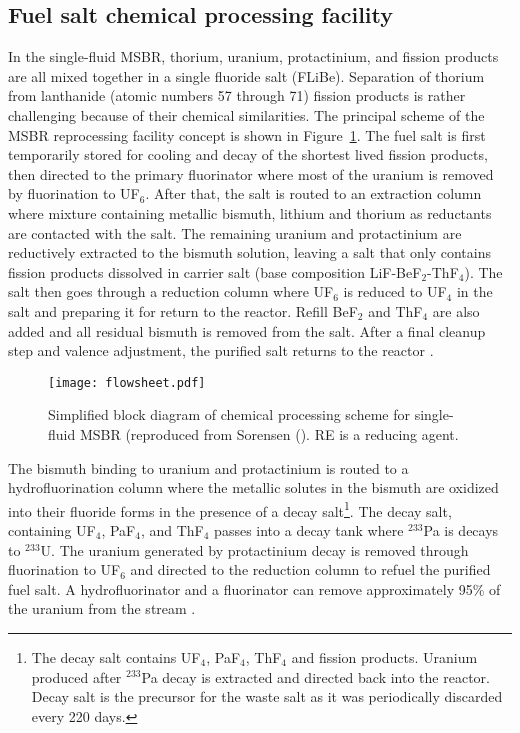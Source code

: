 \subsection{Fuel salt chemical processing facility} \label{sec:chemical_processing}
In the single-fluid \gls{MSBR}, thorium, uranium, 
protactinium, and fission products are all mixed together in a single fluoride salt (FLiBe). Separation of thorium from lanthanide (atomic numbers 57 through 71) fission products is rather challenging because of their chemical similarities. The principal scheme of the \gls{MSBR} reprocessing facility concept is shown in Figure~\ref{fig:material_flow}. The fuel salt is first temporarily stored for cooling and decay of the shortest lived fission products, then directed to the primary fluorinator where most of the uranium is removed by fluorination to UF$_6$. After that, the salt is routed to an extraction column where mixture containing metallic bismuth, lithium and thorium as reductants are contacted with the salt. The remaining uranium and protactinium are reductively extracted to the bismuth solution, leaving a salt that only contains fission products dissolved in carrier salt (base composition LiF-BeF$_2$-ThF$_4$). The salt then goes through a reduction column where UF$_6$ is reduced to UF$_4$ in the salt and preparing it for return to the reactor. Refill BeF$_2$ and ThF$_4$ are also added and all residual bismuth is removed from the salt. After a final cleanup step and valence adjustment, the purified salt returns to the reactor \cite{carter_design_1972,sorensen_one-fluid_2006}.
\begin{figure}[htp!] %
  \centering
  \texttt{[image: flowsheet.pdf]}
  \caption{Simplified block diagram of chemical processing scheme for single-fluid \gls{MSBR} (reproduced 
  from Sorensen (\cite{sorensen_one-fluid_2006}). RE is a reducing agent.}
  \label{fig:material_flow}
\end{figure}

The bismuth binding to uranium and protactinium is routed to a hydrofluorination column where the metallic solutes in the bismuth are oxidized into their fluoride forms in the presence of a decay salt\footnote{The decay salt contains UF$_4$, PaF$_4$, ThF$_4$ and fission products. Uranium produced after $^{233}$Pa decay is extracted and directed back into the reactor. Decay salt is the precursor for the waste salt as it was periodically discarded every 220 days.}. The decay salt, containing UF$_4$, PaF$_4$, and ThF$_4$ passes into a decay tank where $^{233}$Pa is decays to $^{233}$U. The uranium generated by protactinium decay is removed through fluorination to UF$_6$ and directed to the reduction column to refuel the purified fuel salt. A hydrofluorinator and a fluorinator can remove approximately 95\% of the uranium from the stream 
\cite{robertson_conceptual_1971}.

